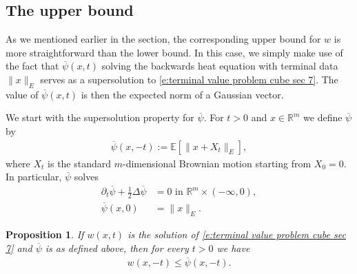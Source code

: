 \documentclass[reqno]{amsart}
\newtheorem{proposition}[theorem]{Proposition}
\numberwithin{equation}{section}
\begin{document}
\subsection{The upper bound} As we mentioned earlier in the section, the corresponding upper bound for $w$ is more straightforward than the lower bound. In this case, we simply make use of the fact that $\overline{\psi}(x,t)$ solving the backwards heat equation with terminal data $\|x\|_E$ serves as a supersolution to \eqref{e:terminal value problem cube sec 7}. The value of $\overline{\psi}(x,t)$ is then the expected norm of a Gaussian vector. 


We start with the supersolution property for $\overline{\psi}$. For $t>0$ and $x\in\mathbb{R}^m$ we define $\overline{\psi}$ by
\begin{align*}
  \overline{\psi}(x,-t) := \mathbb{E}[\|x+X_t\|_E],    
\end{align*}
where $X_t$ is the standard $m$-dimensional Brownian motion starting from $X_0 = 0$. In particular, $\overline{\psi}$ solves
\begin{align*}
  \partial_t \overline{\psi} + \tfrac{1}{2}\Delta \overline{\psi} & = 0 \text{ in } \mathbb{R}^m\times (-\infty,0),\\
  \overline{\psi}(x,0) & = \|x\|_E.
\end{align*}


\begin{proposition}\label{p:heat equation is a supersolution to MCF level set eqn}
  If $w(x,t)$ is the solution of \eqref{e:terminal value problem cube sec 7} and $\overline{\psi}$ is as defined above, then for every $t>0$ we have
  \begin{align*}
    w(x,-t) \leq \overline{\psi}(x,-t).
  \end{align*}
\end{proposition}
\end{document}
